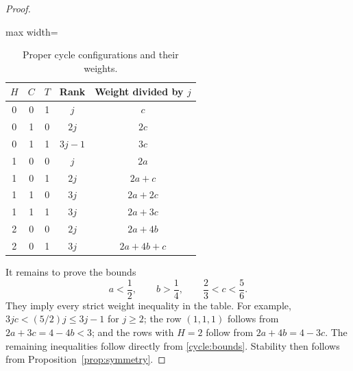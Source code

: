 \begin{proof}
\begin{table}[ht]
\centering
\caption{Proper cycle configurations and their weights.}
\label{cycle:flats}
\begin{adjustbox}{max width=\textwidth}
\begin{tabular}{ccccc}
\toprule
$H$ & $C$ & $T$ & Rank & Weight divided by $j$\\
\midrule
0&0&1&$j$&$c$\\
0&1&0&$2j$&$2c$\\
0&1&1&$3j-1$&$3c$\\
1&0&0&$j$&$2a$\\
1&0&1&$2j$&$2a+c$\\
1&1&0&$3j$&$2a+2c$\\
1&1&1&$3j$&$2a+3c$\\
2&0&0&$2j$&$2a+4b$\\
2&0&1&$3j$&$2a+4b+c$\\
\bottomrule
\end{tabular}
\end{adjustbox}
\end{table}

It remains to prove the bounds
\begin{equation}\label{cycle:bounds}
 a<\frac12,\qquad b>\frac14,\qquad \frac23<c<\frac56.
\end{equation}
They imply every strict weight inequality in the table. For example,
$3jc<(5/2)j\le3j-1$ for $j\ge2$; the row $(1,1,1)$ follows from
$2a+3c=4-4b<3$; and the rows with $H=2$ follow from
$2a+4b=4-3c$. The remaining inequalities follow directly from
\eqref{cycle:bounds}. Stability then follows from Proposition~\ref{prop:symmetry}.


\end{proof}
